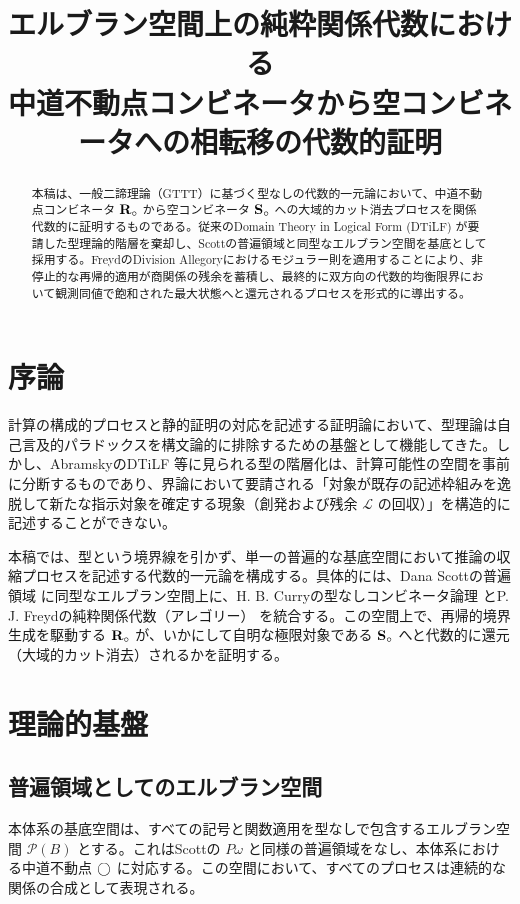 \documentclass[11pt,a4paper]{ltjsarticle}
\theoremstyle{definition}
\begin{document}
\title{エルブラン空間上の純粋関係代数における\\中道不動点コンビネータから空コンビネータへの相転移の代数的証明}
\author{}
\date{}
\maketitle

\begin{abstract}
本稿は、一般二諦理論（GTTT）に基づく型なしの代数的一元論において、中道不動点コンビネータ $\mathbf{R}_{\circ}$ から空コンビネータ $\mathbf{S}_{\circ}$ への大域的カット消去プロセスを関係代数的に証明するものである。従来のDomain Theory in Logical Form (DTiLF) が要請した型理論的階層を棄却し、Scottの普遍領域と同型なエルブラン空間を基底として採用する。FreydのDivision Allegoryにおけるモジュラー則を適用することにより、非停止的な再帰的適用が商関係の残余を蓄積し、最終的に双方向の代数的均衡限界において観測同値で飽和された最大状態へと還元されるプロセスを形式的に導出する。
\end{abstract}

\section{序論}
計算の構成的プロセスと静的証明の対応を記述する証明論において、型理論は自己言及的パラドックスを構文論的に排除するための基盤として機能してきた。しかし、AbramskyのDTiLF \cite{Abramsky1991} 等に見られる型の階層化は、計算可能性の空間を事前に分断するものであり、界論において要請される「対象が既存の記述枠組みを逸脱して新たな指示対象を確定する現象（創発および残余 $\mathcal{L}$ の回収）」を構造的に記述することができない。

本稿では、型という境界線を引かず、単一の普遍的な基底空間において推論の収縮プロセスを記述する代数的一元論を構成する。具体的には、Dana Scottの普遍領域 \cite{Scott1976} に同型なエルブラン空間上に、H. B. Curryの型なしコンビネータ論理 \cite{Curry1958} とP. J. Freydの純粋関係代数（アレゴリー） \cite{Freyd1990} を統合する。この空間上で、再帰的境界生成を駆動する $\mathbf{R}_{\circ}$ が、いかにして自明な極限対象である $\mathbf{S}_{\circ}$ へと代数的に還元（大域的カット消去）されるかを証明する。

\section{理論的基盤}

\subsection{普遍領域としてのエルブラン空間}
本体系の基底空間は、すべての記号と関数適用を型なしで包含するエルブラン空間 $\mathcal{P}(B)$ とする。これはScottの $P\omega$ \cite{Scott1976} と同様の普遍領域をなし、本体系における中道不動点 $\bigcirc$ に対応する。この空間において、すべてのプロセスは連続的な関係の合成として表現される。
\end{document}
